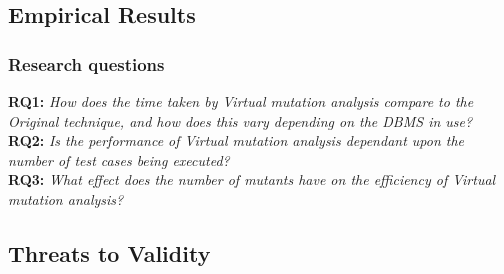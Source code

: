 	\subsection{Empirical Results}

		\begin{table*}[t]
			\caption{\label{tbl:time_saved_by_dbms_table}
				Time saving summary.
			}\vspace{1em}
			\scriptsize
			\centering
		\end{table*}

		\subsubsection{Research questions}

			\textbf{RQ1: }\emph{How does the time taken by Virtual mutation analysis compare to the Original technique, and how does this vary depending on the DBMS in use?}\\


			\textbf{RQ2: }\emph{Is the performance of Virtual mutation analysis dependant upon the number of test cases being executed?}\\


			\textbf{RQ3: }\emph{What effect does the number of mutants have on the efficiency of Virtual mutation analysis?}\\


		

	\subsection{Threats to Validity}
